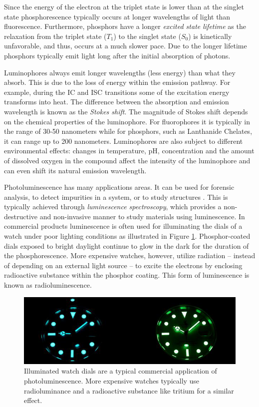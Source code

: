 \documentclass[thesis.tex]{subfiles}
\begin{document}
\noindent Since the energy of the electron at the triplet state is lower than at the singlet state phosphorescence typically occurs at longer wavelengths of light than fluorescence. Furthermore, phosphors have a longer \emph{excited state lifetime} as the relaxation from the triplet state ($T_1$) to the singlet state ($S_0$) is kinetically unfavorable, and thus, occurs at a much slower pace. Due to the longer lifetime phosphors typically emit light long after the initial absorption of photons. \cite{CEJ}

Luminophores always emit longer wavelengths (less energy) than what they absorb. This is due to the loss of energy within the emission pathway. For example, during the IC and ISC transitions some of the excitation energy transforms into heat. The difference between the absorption and emission wavelength is known as the \emph{Stokes shift}. The magnitude of Stokes shift depends on the chemical properties of the luminophore. For fluorophores it is typically in the range of 30-50 nanometers while for phosphors, such as Lanthanide Chelates, it can range up to 200 nanometers. Luminophores are also subject to different environmental effects: changes in temperature, pH, concentration and the amount of dissolved oxygen in the compound affect the intensity of the luminophore and can even shift its natural emission wavelength. \cite{luminescence_basics}\cite{hemmila}

Photoluminescence has many applications areas. It can be used for forensic analysis, to detect impurities in a system, or to study structures \cite{photoluminescence_use_case_2}\cite{photoluminescence_use_case_1}\cite{photoluminescence_use_case_3}. This is typically achieved through \emph{luminescence spectroscopy}, which provides a non-destructive and non-invasive manner to study materials using luminescence. In commercial products luminescence is often used for illuminating the dials of a watch under poor lighting conditions as illustrated in Figure \ref{figure:photoluminescence_example}. Phosphor-coated dials exposed to bright daylight continue to glow in the dark for the duration of the phosphorescence. More expensive watches, however, utilize radiation -- instead of depending on an external light source -- to excite the electrons by enclosing radioactive substance within the phosphor coating. This form of luminescence is known as radioluminescence.

\begin{figure}[ht]
\centering \includegraphics[width=\textwidth]{images/photoluminescence_example}
\caption{Illuminated watch dials are a typical commercial application of photoluminescence. More expensive watches typically use radioluminance and a radioactive substance like tritium for a similar effect.\label{figure:photoluminescence_example}}
\end{figure}
\end{document}
